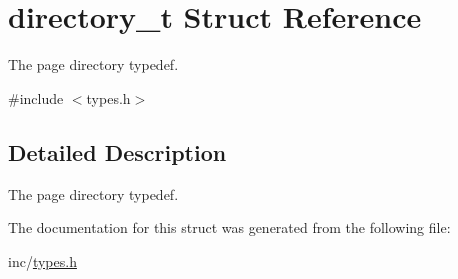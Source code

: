 \hypertarget{structdirectory__t}{
\section{directory\_\-t Struct Reference}
\label{structdirectory__t}
}


The page directory typedef.  




{\ttfamily \#include $<$types.h$>$}



\subsection{Detailed Description}
The page directory typedef. 

The documentation for this struct was generated from the following file:\begin{DoxyCompactItemize}
\item 
inc/\hyperlink{types_8h}{types.h}\end{DoxyCompactItemize}

